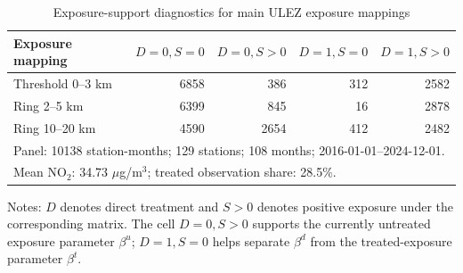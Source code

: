 \begin{table}[!htbp]\centering
\caption{Exposure-support diagnostics for main ULEZ exposure mappings}
\label{tab:ulez_support_protocol}
\begin{threeparttable}
\begin{tabular}{lrrrr}
\toprule
Exposure mapping & $D=0,S=0$ & $D=0,S>0$ & $D=1,S=0$ & $D=1,S>0$ \\
\midrule
Threshold 0--3 km & 6858 & 386 & 312 & 2582 \\
Ring 2--5 km & 6399 & 845 & 16 & 2878 \\
Ring 10--20 km & 4590 & 2654 & 412 & 2482 \\
\midrule
\multicolumn{5}{l}{Panel: 10138 station-months; 129 stations; 108 months; 2016-01-01--2024-12-01.} \\
\multicolumn{5}{l}{Mean NO$_2$: 34.73 $\mu$g/m$^3$; treated observation share: 28.5\%.} \\
\bottomrule
\end{tabular}
\begin{tablenotes}[flushleft]
\footnotesize
\item Notes: $D$ denotes direct treatment and $S>0$ denotes positive exposure under the corresponding matrix. The cell $D=0,S>0$ supports the currently untreated exposure parameter $\beta^u$; $D=1,S=0$ helps separate $\beta^d$ from the treated-exposure parameter $\beta^t$.
\end{tablenotes}
\end{threeparttable}
\end{table}
